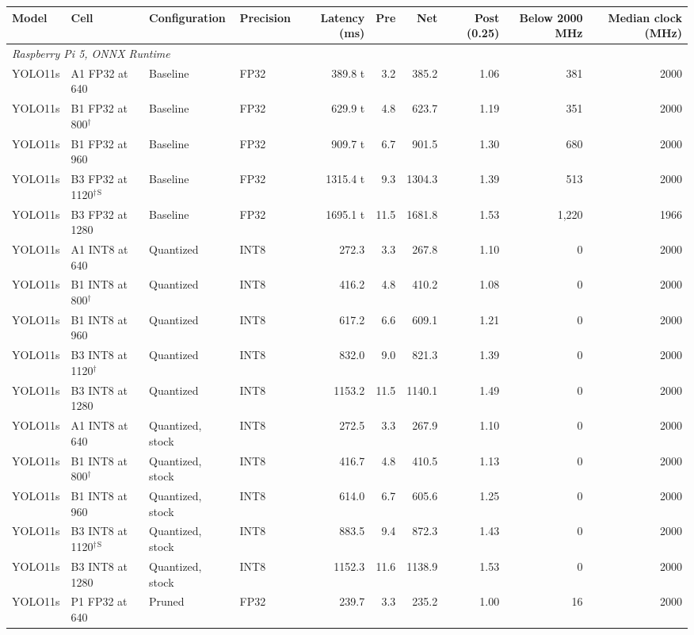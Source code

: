\begin{longtable}{llllrrrrrr}
\toprule
Model & Cell & Configuration & Precision & Latency (ms) & Pre & Net & Post (0.25) & Below 2000 MHz & Median clock (MHz) \\
\midrule
\endhead
\multicolumn{10}{l}{\textit{Raspberry Pi 5, ONNX Runtime}} \\
YOLO11s & A1 FP32 at 640 & Baseline & FP32 & 389.8 t & 3.2 & 385.2 & 1.06 & 381 & 2000 \\
YOLO11s & B1 FP32 at 800$^{\dagger}$ & Baseline & FP32 & 629.9 t & 4.8 & 623.7 & 1.19 & 351 & 2000 \\
YOLO11s & B1 FP32 at 960 & Baseline & FP32 & 909.7 t & 6.7 & 901.5 & 1.30 & 680 & 2000 \\
YOLO11s & B3 FP32 at 1120$^{\dagger}$$^{\mathrm{S}}$ & Baseline & FP32 & 1315.4 t & 9.3 & 1304.3 & 1.39 & 513 & 2000 \\
YOLO11s & B3 FP32 at 1280 & Baseline & FP32 & 1695.1 t & 11.5 & 1681.8 & 1.53 & 1{,}220 & 1966 \\
YOLO11s & A1 INT8 at 640 & Quantized & INT8 & 272.3 & 3.3 & 267.8 & 1.10 & 0 & 2000 \\
YOLO11s & B1 INT8 at 800$^{\dagger}$ & Quantized & INT8 & 416.2 & 4.8 & 410.2 & 1.08 & 0 & 2000 \\
YOLO11s & B1 INT8 at 960 & Quantized & INT8 & 617.2 & 6.6 & 609.1 & 1.21 & 0 & 2000 \\
YOLO11s & B3 INT8 at 1120$^{\dagger}$ & Quantized & INT8 & 832.0 & 9.0 & 821.3 & 1.39 & 0 & 2000 \\
YOLO11s & B3 INT8 at 1280 & Quantized & INT8 & 1153.2 & 11.5 & 1140.1 & 1.49 & 0 & 2000 \\
YOLO11s & A1 INT8 at 640 & Quantized, stock & INT8 & 272.5 & 3.3 & 267.9 & 1.10 & 0 & 2000 \\
YOLO11s & B1 INT8 at 800$^{\dagger}$ & Quantized, stock & INT8 & 416.7 & 4.8 & 410.5 & 1.13 & 0 & 2000 \\
YOLO11s & B1 INT8 at 960 & Quantized, stock & INT8 & 614.0 & 6.7 & 605.6 & 1.25 & 0 & 2000 \\
YOLO11s & B3 INT8 at 1120$^{\dagger}$$^{\mathrm{S}}$ & Quantized, stock & INT8 & 883.5 & 9.4 & 872.3 & 1.43 & 0 & 2000 \\
YOLO11s & B3 INT8 at 1280 & Quantized, stock & INT8 & 1152.3 & 11.6 & 1138.9 & 1.53 & 0 & 2000 \\
YOLO11s & P1 FP32 at 640 & Pruned & FP32 & 239.7 & 3.3 & 235.2 & 1.00 & 16 & 2000 \\

\end{longtable}
